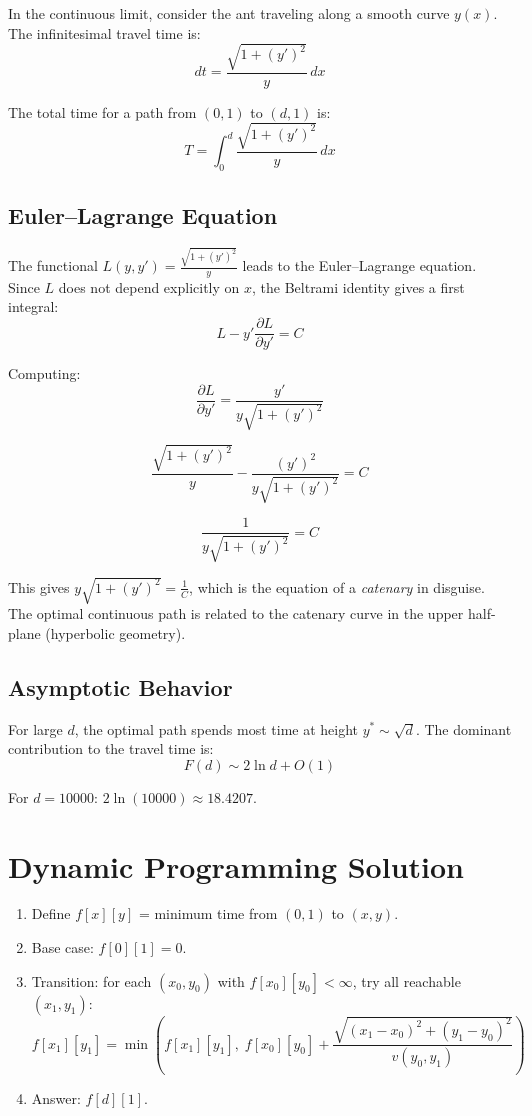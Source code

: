 \documentclass[11pt]{article}
\begin{document}
In the continuous limit, consider the ant traveling along a smooth curve $y(x)$.
The infinitesimal travel time is:
\[
dt = \frac{\sqrt{1 + (y')^2}}{y}\,dx
\]

The total time for a path from $(0, 1)$ to $(d, 1)$ is:
\[
T = \int_0^d \frac{\sqrt{1 + (y')^2}}{y}\,dx
\]

\subsection{Euler--Lagrange Equation}

The functional $L(y, y') = \frac{\sqrt{1 + (y')^2}}{y}$ leads to the
Euler--Lagrange equation. Since $L$ does not depend explicitly on $x$,
the Beltrami identity gives a first integral:
\[
L - y' \frac{\partial L}{\partial y'} = C
\]

Computing:
\[
\frac{\partial L}{\partial y'} = \frac{y'}{y\sqrt{1 + (y')^2}}
\]

\[
\frac{\sqrt{1 + (y')^2}}{y} - \frac{(y')^2}{y\sqrt{1 + (y')^2}} = C
\]

\[
\frac{1}{y\sqrt{1 + (y')^2}} = C
\]

This gives $y\sqrt{1 + (y')^2} = \frac{1}{C}$, which is the equation of a
\emph{catenary} in disguise. The optimal continuous path is related to the
catenary curve in the upper half-plane (hyperbolic geometry).

\subsection{Asymptotic Behavior}

For large $d$, the optimal path spends most time at height $y^* \sim \sqrt{d}$.
The dominant contribution to the travel time is:
\[
F(d) \sim 2 \ln d + O(1)
\]

For $d = 10000$: $2 \ln(10000) \approx 18.4207$.

\section{Dynamic Programming Solution}

\begin{enumerate}
    \item Define $f[x][y]$ = minimum time from $(0, 1)$ to $(x, y)$.
    \item Base case: $f[0][1] = 0$.
    \item Transition: for each $(x_0, y_0)$ with $f[x_0][y_0] < \infty$,
    try all reachable $(x_1, y_1)$:
    \[
    f[x_1][y_1] = \min\left(f[x_1][y_1],\; f[x_0][y_0] + \frac{\sqrt{(x_1-x_0)^2 + (y_1-y_0)^2}}{v(y_0, y_1)}\right)
    \]
    \item Answer: $f[d][1]$.
\end{enumerate}
\end{document}
